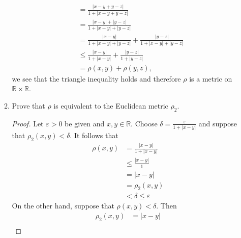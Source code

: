 \documentclass{article}
\begin{document}
\begin{enumerate}
\begin{enumerate}
\begin{align*}
                                        & = \frac{\lvert x-y+y-z\rvert}{1+\lvert x-y+y-z\rvert}                                                                       \\
                                        & = \frac{\lvert x-y\rvert+\lvert y-z\rvert}{1+\lvert x-y\rvert+\lvert y-z\rvert}                                             \\
                                        & = \frac{\lvert x-y\rvert}{1+\lvert x-y\rvert+\lvert y-z\rvert}+\frac{\lvert y-z\rvert}{1+\lvert x-y\rvert+\lvert y-z\rvert} \\
                                        & \leq \frac{\lvert x-y\rvert}{1+\lvert x-y\rvert}+\frac{\lvert y-z\rvert}{1+\lvert y-z\rvert}                                \\
                                        & = \rho(x,y) + \rho(y,z),
                        \end{align*}
                        we see that the triangle inequality holds and therefore $\rho$
                        is a metric on $\mathbb{R}\times\mathbb{R}$.
                  \item Prove that $\rho$ is equivalent to the Euclidean
                        metric $\rho_2$.
                        \begin{proof}
                              Let $\varepsilon>0$ be given and $x, y\in\mathbb{R}$.
                              Choose $\delta=\frac{\varepsilon}{1+\lvert x-y\rvert}$ and suppose that $\rho_2(x,y)<\delta$.
                              It follows that
                              \begin{align*}
                                    \rho(x, y) & = \frac{\lvert x-y\rvert}{1+\lvert x-y\rvert} \\
                                               & \leq \frac{\lvert x-y\rvert}{1}               \\
                                               & = \lvert x-y\rvert                            \\
                                               & = \rho_2(x, y)                                \\
                                               & < \delta \leq \varepsilon
                              \end{align*}
                              On the other hand, suppose that $\rho(x,y)<\delta$. Then
                              \begin{align*}
                                    \rho_2(x, y) & = \lvert x-y\rvert                                                \\

\end{align*}
\end{proof}
\end{enumerate}
\end{enumerate}
\end{document}
